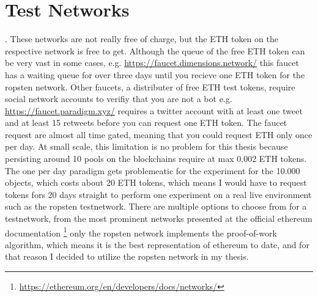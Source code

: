 \section{Test Networks}. 
These networks are not really free of charge, but the ETH token on the respective network is free to get. Although the queue of the free ETH token can be very vast in some cases, e.g. \url{https://faucet.dimensions.network/} this faucet has a waiting queue for over three days until you recieve one ETH token for the ropsten network. Other faucets, a distributer of free ETH test tokens, require social network accounts to verifiy that you are not a bot e.g. \url{https://faucet.paradigm.xyz/} requires a twitter account with at least one tweet and at least 15 retweets before you can request one ETH token. The faucet request are almost all time gated, meaning that you could request ETH only once per day. At small scale, this limitation is no problem for this thesis because persisting around 10 pools on the blockchains require at max 0.002 ETH tokens. The one per day paradigm gets problemeatic for the experiment for the 10.000 objects, which costs about 20 ETH tokens, which means I would have to request tokens fors 20 days straight to perform one experiment on a real live environment such as the ropsten testnetwork. 
There are multiple options to choose from for a testnetwork, from the most prominent networks presented at the official ethereum documentation \footnote{\url{https://ethereum.org/en/developers/docs/networks/}} only the ropsten network implements the proof-of-work algorithm, which means it is the best representation of ethereum to date, and for that reason I decided to utilize the ropsten network in my thesis.
